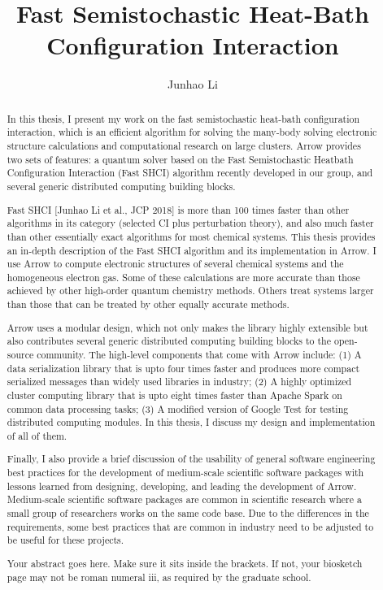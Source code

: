 \documentclass[phd,tocprelim]{cornell}
\title {Fast Semistochastic Heat-Bath Configuration Interaction}
\author {Junhao Li}
\begin{document}
\maketitle
\makecopyright

\begin{abstract}
In this thesis, I present my work on the fast semistochastic heat-bath configuration interaction, which is an efficient algorithm for solving the many-body solving electronic structure calculations and computational research on large clusters. Arrow provides two sets of features: a quantum solver based on the Fast Semistochastic Heatbath Configuration Interaction (Fast SHCI) algorithm recently developed in our group, and several generic distributed computing building blocks.

Fast SHCI [Junhao Li et al., JCP 2018] is more than 100 times faster than other algorithms in its category (selected CI plus perturbation theory), and also much faster than other essentially exact algorithms for most chemical systems. This thesis provides an in-depth description of the Fast SHCI algorithm and its implementation in Arrow. I use Arrow to compute electronic structures of several chemical systems and the homogeneous electron gas.  Some of these calculations are more accurate than those achieved by other high-order quantum chemistry methods.  Others treat systems larger than those that can be treated by other equally accurate methods.

Arrow uses a modular design, which not only makes the library highly extensible but also contributes several generic distributed computing building blocks to the open-source community. The high-level components that come with Arrow include:
(1) A data serialization library that is upto four times faster and produces more compact serialized messages than widely used libraries in industry;
(2) A highly optimized cluster computing library that is upto eight times faster than Apache Spark on common data processing tasks;
(3) A modified version of Google Test for testing distributed computing modules.
In this thesis, I discuss my design and implementation of all of them.

Finally, I also provide a brief discussion of the usability of general software engineering best practices for the development of medium-scale scientific software packages with lessons learned from designing, developing, and leading the development of Arrow. Medium-scale scientific software packages are common in scientific research where a small group of researchers works on the same code base. Due to the differences in the requirements, some best practices that are common in industry need to be adjusted to be useful for these projects.

Your abstract goes here. Make sure it sits inside the brackets. If not,
your biosketch page may not be roman numeral iii, as required by the
graduate school.
\end{abstract}
\end{document}
